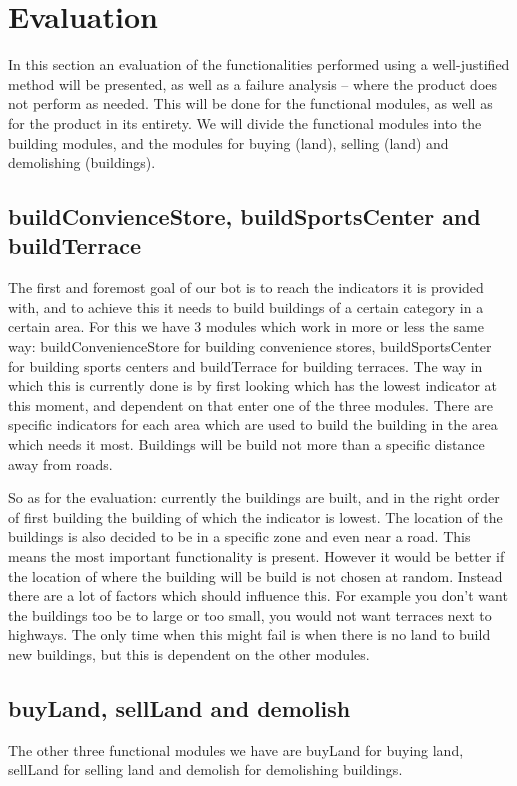 \section{Evaluation}
In this section an evaluation of the functionalities performed using a well-justified method will be presented, as well as a failure analysis – where the product does not perform as needed. This will be done for the functional modules, as well as for the product in its entirety. We will divide the functional modules into the building modules, and the modules for buying (land), selling (land) and demolishing (buildings).
\subsection{buildConvienceStore, buildSportsCenter and buildTerrace}
The first and foremost goal of our bot is to reach the indicators it is provided with, and to achieve this it needs to build buildings of a certain category in a certain area. For this we have 3 modules which work in more or less the same way: buildConvenienceStore for building convenience stores, buildSportsCenter for building sports centers and buildTerrace for building terraces. The way in which this is currently done is by first looking which has the lowest indicator at this moment, and dependent on that enter one of the three modules. There are specific indicators for each area which are used to build the building in the area which needs it most. Buildings will be build not more than a specific distance away from roads.

So as for the evaluation: currently the buildings are built, and in the right order of first building the building of which the indicator is lowest. The location of the buildings is also decided to be in a specific zone and even near a road. This means the most important functionality is present. However it would be better if the location of where the building will be build is not chosen at random. Instead there are a lot of factors which should influence this. For example you don't want the buildings too be to large or too small, you would not want terraces next to highways. The only time when this might fail is when there is no land to build new buildings, but this is dependent on the other modules.

\subsection{buyLand, sellLand and demolish}
The other three functional modules we have are buyLand for buying land, sellLand for selling land and demolish for demolishing buildings. 

